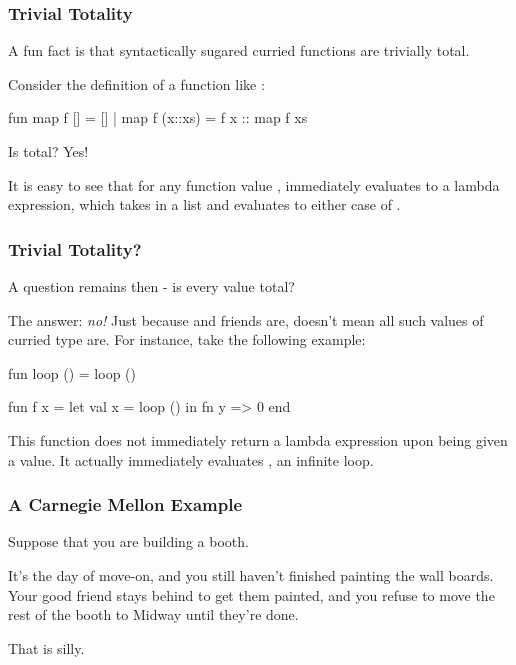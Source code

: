 \documentclass[aspectratio=169]{beamer}
\begin{document}
\begin{frame}[fragile]
  \frametitle{Trivial Totality}

  A fun fact is that syntactically sugared curried functions are trivially total\footnotemark.  

  \vspace{\fill}

  Consider the definition of a function like :

  \vspace{5pt}

  \begin{codeblock}
    fun map f [] = []
      | map f (x::xs) = f x :: map f xs
  \end{codeblock}

  \vspace{\fill}

  Is  total? Yes!

  It is easy to see that for any function value ,  immediately
  evaluates to a lambda expression, which takes in a list and evaluates to either
  case of . 

\end{frame}

\begin{frame}[fragile]
  \frametitle{Trivial Totality?}

  A question remains then - is every value  total?

  The answer: \textit{no!} Just because  and friends are, doesn't mean
  all such values of curried type are. For instance, take the following example:

  \begin{codeblock}
    fun loop () = loop () 

    fun f x = 
      let
        val x = loop ()
      in
        fn y => 0 
      end
  \end{codeblock}

  This function does not immediately return a lambda expression upon being given a
  value. It actually immediately evaluates , an infinite loop.
\end{frame}

\begin{frame}[fragile]
  \frametitle{A Carnegie Mellon Example}

  Suppose that you are building a booth.

  It's the day of move-on, and you still haven't finished painting the wall boards. Your
  good friend stays behind to get them painted, and you refuse to move the rest of 
  the booth to Midway until they're done.

  That is silly.
\end{frame}
\end{document}

